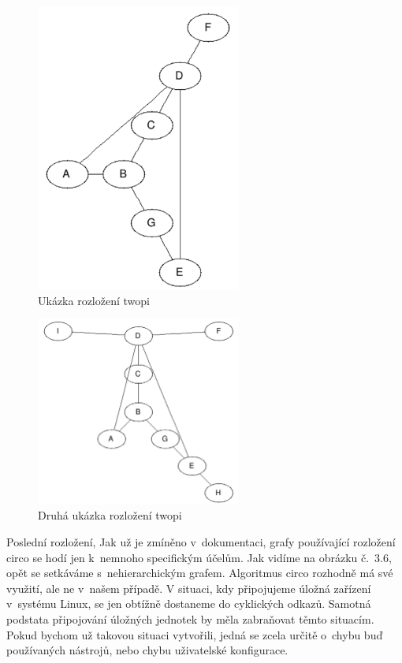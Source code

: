 \documentclass[color,table,oneside,nolot,nolof]{fithesis}
\begin{document}
\begin{figure}
	\label{fig:Ukázka rozložení twopi}
	\caption{Ukázka rozložení twopi}
	\centering
	\includegraphics[width=0.6\textwidth]{pictures/twopi_example.png} 
\end{figure}
\begin{figure}
	\label{fig:Ukázka rozložení twopi}
	\caption{Druhá ukázka rozložení twopi}
	\centering
	\includegraphics[width=0.6\textwidth]{pictures/twopi_example_2.png} 
\end{figure}

	Poslední rozložení, \cite{graphviz_layout} 
	Jak už je zmíněno v~dokumentaci, grafy používající rozložení 
	circo se hodí jen k~nemnoho specifickým účelům. Jak vidíme na obrázku č.~3.6, opět se setkáváme s~nehierarchickým grafem. Algoritmus circo rozhodně má své využití, ale ne v~našem případě. V
	situaci, kdy připojujeme úložná zařízení v~systému Linux, se jen obtížně dostaneme do cyklických odkazů. Samotná podstata připojování úložných jednotek by měla zabraňovat těmto
	situacím. Pokud bychom už takovou situaci vytvořili, jedná se zcela určitě o~chybu buď používaných nástrojů, nebo chybu uživatelské konfigurace. 
\end{document}
